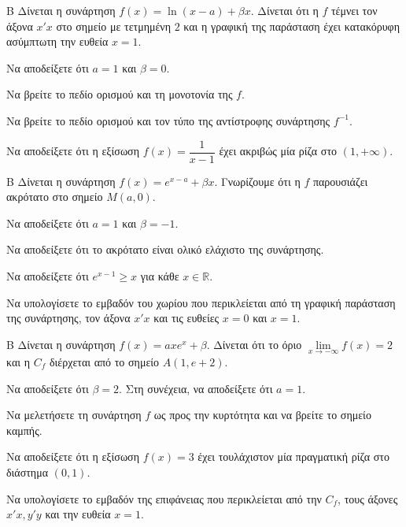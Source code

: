 \begin{thema}{Β}
Δίνεται η συνάρτηση $f(x) = \ln(x-a) + \beta x$. Δίνεται ότι η $f$ τέμνει τον άξονα $x'x$ στο σημείο με τετμημένη $2$ και η γραφική της παράσταση έχει κατακόρυφη ασύμπτωτη την ευθεία $x=1$.
\begin{erwthma}
  \item Να αποδείξετε ότι $a=1$ και $\beta=0$.
  \item Να βρείτε το πεδίο ορισμού και τη μονοτονία της $f$.
  \item Να βρείτε το πεδίο ορισμού και τον τύπο της αντίστροφης συνάρτησης $f^{-1}$.
  \item Να αποδείξετε ότι η εξίσωση $f(x) = \dfrac{1}{x-1}$ έχει ακριβώς μία ρίζα στο $(1, +\infty)$.
\end{erwthma}
\end{thema}

\begin{thema}{Β}
Δίνεται η συνάρτηση $f(x) = e^{x-a} + \beta x$. Γνωρίζουμε ότι η $f$ παρουσιάζει ακρότατο στο σημείο $M(a, 0)$.
\begin{erwthma}
  \item Να αποδείξετε ότι $a=1$ και $\beta=-1$.
  \item Να αποδείξετε ότι το ακρότατο είναι ολικό ελάχιστο της συνάρτησης.
  \item Να αποδείξετε ότι $e^{x-1} \ge x$ για κάθε $x \in \mathbb{R}$.
  \item Να υπολογίσετε το εμβαδόν του χωρίου που περικλείεται από τη γραφική παράσταση της συνάρτησης, τον άξονα $x'x$ και τις ευθείες $x=0$ και $x=1$.
\end{erwthma}
\end{thema}

\begin{thema}{Β}
Δίνεται η συνάρτηση $f(x) = a x e^x + \beta$. Δίνεται ότι το όριο $\lim\limits_{x \to -\infty} f(x) = 2$ και η $C_f$ διέρχεται από το σημείο $A(1, e+2)$.
\begin{erwthma}
  \item Να αποδείξετε ότι $\beta=2$. Στη συνέχεια, να αποδείξετε ότι $a=1$.
  \item Να μελετήσετε τη συνάρτηση $f$ ως προς την κυρτότητα και να βρείτε το σημείο καμπής.
  \item Να αποδείξετε ότι η εξίσωση $f(x) = 3$ έχει τουλάχιστον μία πραγματική ρίζα στο διάστημα $(0, 1)$.
  \item Να υπολογίσετε το εμβαδόν της επιφάνειας που περικλείεται από την $C_f$, τους άξονες $x'x, y'y$ και την ευθεία $x=1$.
\end{erwthma}
\end{thema}

